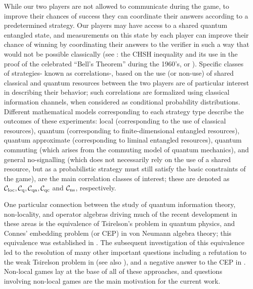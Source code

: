 \documentclass[11pt]{amsart}
\newcommand{\cl}[1]{\mathcal{#1}}
\begin{document}
While our two players are not allowed to communicate during the game, to improve their chances of success they can coordinate their answers according to a predetermined strategy. Our players may have access to a shared quantum entangled state, and measurements on this state by each player can improve their chance of winning by coordinating their answers to the verifier in such a way that would not be possible classically (see \cite{bell}: the CHSH inequality and its use in the proof of the celebrated “Bell’s Theorem” during the 1960’s, or \cite{bct}). Specific classes of strategies- known as correlations-, based on the use (or non-use) of shared classical and quantum resources between the two players are of particular interest in describing their behavior; such correlations are formalized using classical information channels, when considered as conditional probability distributions. Different mathematical models corresponding to each strategy type describe the outcomes of these experiments: local (corresponding to the use of classical resources), quantum (corresponding to finite-dimensional entangled resources), quantum approximate (corresponding to liminal entangled resources), quantum commuting (which arises from the commuting model of quantum mechanics), and general no-signalling (which does not necessarily rely on the use of a shared resource, but as a probabilistic strategy must still satisfy the basic constraints of the game), are the main correlation classes of interest; these are denoted as $\cl{C}_{\rm loc}, \cl{C}_{\rm q}, \cl{C}_{\rm qa}, \cl{C}_{\rm qc}$ and $\cl{C}_{\rm ns}$, respectively. 

One particular connection between the study of quantum information theory, non-locality, and operator algebras driving much of the recent development in these areas is the equivalence of Tsirelson's problem in quantum physics, and Connes' embedding problem (or CEP) in von Neumann algebra theory; this equivalence was established in \cite{fritz, jnppsw, ozawa}. The subsequent investigation of this equivalence led to the resolution of many other important questions including a refutation to the weak Tsirelson problem in \cite{slofstra_one} (see also \cite{dpp}), and a negative answer to the CEP in \cite{mipre}. Non-local games lay at the base of all of these approaches, and questions involving non-local games are the main motivation for the current work.
\end{document}
